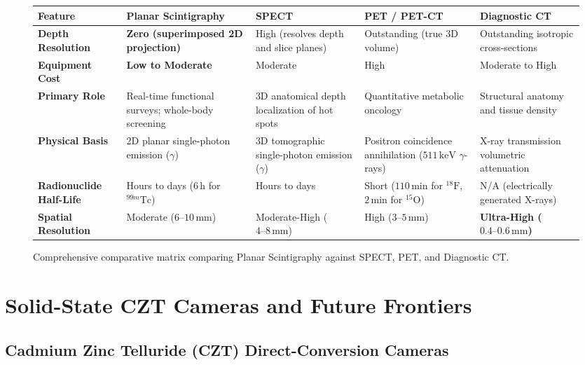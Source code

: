 \documentclass[11pt,a4paper]{article}
\begin{document}
\begin{figure}[htbp]
\centering
\small
\setlength{\tabcolsep}{3pt}
\begin{tabular}{p{2.6cm}p{3.0cm}p{3.1cm}p{3.1cm}p{2.8cm}}
\toprule
\textbf{Feature} & \textbf{Planar Scintigraphy} & \textbf{SPECT} & \textbf{PET / PET-CT} & \textbf{Diagnostic CT} \\
\midrule
\textbf{Depth Resolution} & \textbf{Zero (superimposed 2D projection)} & High (resolves depth and slice planes) & Outstanding (true 3D volume) & Outstanding isotropic cross-sections \\
\addlinespace
\textbf{Equipment Cost} & \textbf{Low to Moderate} & Moderate & High & Moderate to High \\
\addlinespace
\textbf{Primary Role} & Real-time functional surveys; whole-body screening & 3D anatomical depth localization of hot spots & Quantitative metabolic oncology & Structural anatomy and tissue density \\
\addlinespace
\textbf{Physical Basis} & 2D planar single-photon emission ($\gamma$) & 3D tomographic single-photon emission ($\gamma$) & Positron coincidence annihilation ($511\,\text{keV}$ $\gamma$-rays) & X-ray transmission volumetric attenuation \\
\addlinespace
\textbf{Radionuclide Half-Life} & Hours to days ($6\,\text{h}$ for $^{99m}\text{Tc}$) & Hours to days & Short ($110\,\text{min}$ for $^{18}\text{F}$, $2\,\text{min}$ for $^{15}\text{O}$) & N/A (electrically generated X-rays) \\
\addlinespace
\textbf{Spatial Resolution} & Moderate ($6\text{--}10\,\text{mm}$) & Moderate-High ($4\text{--}8\,\text{mm}$) & High ($3\text{--}5\,\text{mm}$) & \textbf{Ultra-High ($0.4\text{--}0.6\,\text{mm}$)} \\
\bottomrule
\end{tabular}
\caption{Comprehensive comparative matrix comparing Planar Scintigraphy against SPECT, PET, and Diagnostic CT.}
\label{tab:scintigraphy_comparison}
\end{figure}

\section{Solid-State CZT Cameras and Future Frontiers}

\subsection{Cadmium Zinc Telluride (CZT) Direct-Conversion Cameras}
\end{document}
